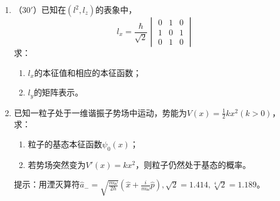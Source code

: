 


\begin{enumerate}
	\item
（$30'$）已知在$(l^2,l_z)$的表象中，
$$l_x=\frac{\hbar}{\sqrt2}\begin{vmatrix}0&1&0\\1&0&1\\0&1&0\end{vmatrix}$$
求：
\begin{enumerate}
	\item
$l_x$的本征值和相应的本征函数；

\item 
$l_y$的矩阵表示。
\end{enumerate}

\banswer{
	
}


\item 
已知一粒子处于一维谐振子势场中运动，势能为$V(x)=\frac{1}{2}kx^2(k>0)$，求：
\begin{enumerate}
	\item
粒子的基态本征函数$\psi_0(x)$；

\item 
若势场突然变为$V'(x)=kx^2$，则粒子仍然处于基态的概率。
\end{enumerate}

提示：用湮灭算符$\hat{a}_-=\sqrt{\frac{m\omega}{2\hbar}}(\hat{x}+\frac{i}{m\omega}\hat{p}),\sqrt2=1.414,\sqrt[4]{2}=1.189$。


\banswer{
	
}




\end{enumerate}
